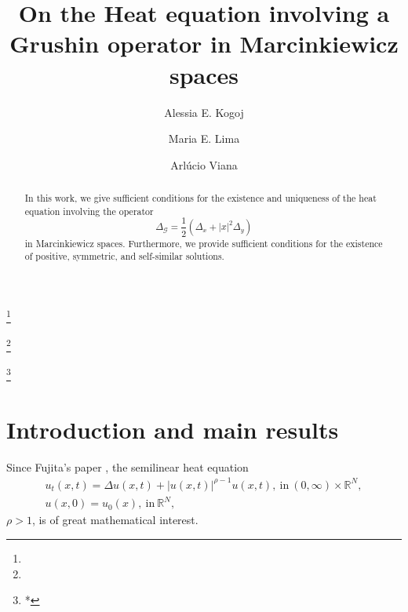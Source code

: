 \documentclass[12pt]{amsart}
\newcommand{\R}{\mathbb{R}}
\begin{document}
	
\title[Heat equation involving a Grushin operator]{On the Heat equation involving a Grushin operator in Marcinkiewicz spaces}


\author[A. E. Kogoj]{Alessia E. Kogoj}
\address{Università degli Studi di Urbino Carlo Bo, Dipartimento di Scienze Pure ed Applicate, Urbino-PU, Italy}
\thanks{}



\author[M. E. Lima]{Maria E. Lima}
\address{Universidade Estadual de Campinas, IMMEC, Campinas-SP, Brazil}
\thanks{}

\author[A. Viana]{Arl\'ucio Viana}
\address{Universidade Federal de Sergipe, Departamento de Matem\'atica, 49100-000 São Cristóvão-SE, Brazil}
\thanks{*} 









\begin{abstract} 
	
	In this work, we give sufficient conditions for the existence and uniqueness of the heat equation involving the operator	
	$$	
	\Delta_{\mathcal{G}}=\dfrac{1}{2}\left(\Delta_{x}+|x|^2\Delta_{y}\right)
	$$
	in Marcinkiewicz spaces. Furthermore, we provide sufficient conditions for the existence of positive, symmetric, and self-similar solutions. 
	
\end{abstract}


\maketitle

\section{Introduction and main results}


Since Fujita's paper \cite{Fujita}, the semilinear heat equation
\begin{eqnarray}\label{sheat}
	u_t(x,t) = \Delta u(x,t) + |u(x,t)|^{\rho-1}u(x,t),\  \mbox{in}\ (0,\infty)\times \R^N ,\\
	u(x,0)=u_0(x),\ \mbox{in}\ \R^N , \label{sheat0}
\end{eqnarray} 
$\rho>1$, is of great mathematical interest. 
\end{document}
